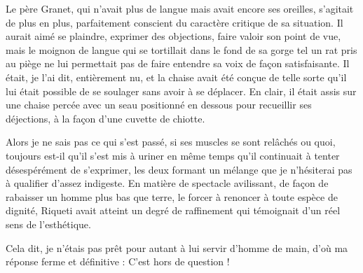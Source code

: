 Le père Granet, qui n’avait plus de langue mais avait encore ses oreilles, s’agitait de plus en plus, parfaitement conscient du caractère critique de sa situation. Il aurait aimé se plaindre, exprimer des objections, faire valoir son point de vue, mais le moignon de langue qui se tortillait dans le fond de sa gorge tel un rat pris au piège ne lui permettait pas de faire entendre sa voix de façon satisfaisante. Il était, je l’ai dit, entièrement nu, et la chaise avait été conçue de telle sorte qu’il lui était possible de se soulager sans avoir à se déplacer. En clair, il était assis sur une chaise percée avec un seau positionné en dessous pour recueillir ses déjections, à la façon d’une cuvette de chiotte.

Alors je ne sais pas ce qui s’est passé, si ses muscles se sont relâchés ou quoi, toujours est-il qu’il s’est mis à uriner en même temps qu’il continuait à tenter désespérément de s’exprimer, les deux formant un mélange que je n’hésiterai pas à qualifier d’assez indigeste. En matière de spectacle avilissant, de façon de rabaisser un homme plus bas que terre, le forcer à renoncer à toute espèce de dignité, Riqueti avait atteint un degré de raffinement qui témoignait d’un réel sens de l’esthétique.

Cela dit, je n’étais pas prêt pour autant à lui servir d’homme de main, d’où ma réponse ferme et définitive : C’est hors de question !

